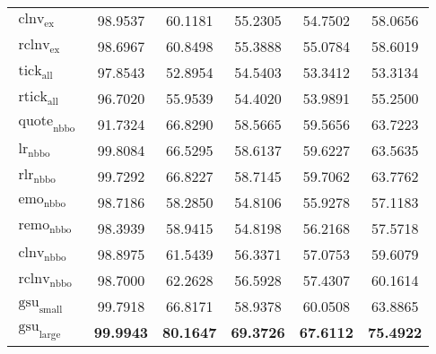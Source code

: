 \begin{table}[ht]
\begin{tabular}{@{}lSSSSS@{}}
        $\operatorname{clnv}_{\mathrm{ex}}$    & 98.9537           & 60.1181                            & 55.2305           & 54.7502           & 58.0656           \\
        $\operatorname{rclnv}_{\mathrm{ex}}$   & 98.6967           & 60.8498                            & 55.3888           & 55.0784           & 58.6019           \\ \midrule
        $\operatorname{tick}_{\mathrm{all}}$   & 97.8543           & 52.8954                            & 54.5403           & 53.3412           & 53.3134           \\
        $\operatorname{rtick}_{\mathrm{all}}$  & 96.7020           & 55.9539                            & 54.4020           & 53.9891           & 55.2500           \\ \midrule
        $\operatorname{quote}_{\mathrm{nbbo}}$ & 91.7324           & 66.8290                            & 58.5665           & 59.5656           & 63.7223           \\
        $\operatorname{lr}_{\mathrm{nbbo}}$    & 99.8084           & 66.5295                            & 58.6137           & 59.6227           & 63.5635           \\
        $\operatorname{rlr}_{\mathrm{nbbo}}$   & 99.7292           & 66.8227                            & 58.7145           & 59.7062           & 63.7762           \\
        $\operatorname{emo}_{\mathrm{nbbo}}$   & 98.7186           & 58.2850                            & 54.8106           & 55.9278           & 57.1183           \\
        $\operatorname{remo}_{\mathrm{nbbo}}$  & 98.3939           & 58.9415                            & 54.8198           & 56.2168           & 57.5718           \\
        $\operatorname{clnv}_{\mathrm{nbbo}}$  & 98.8975           & 61.5439                            & 56.3371           & 57.0753           & 59.6079           \\
        $\operatorname{rclnv}_{\mathrm{nbbo}}$ & 98.7000           & 62.2628                            & 56.5928           & 57.4307           & 60.1614           \\ \midrule
        $\operatorname{gsu}_{\mathrm{small}}$  & 99.7918           & 66.8171                            & 58.9378           & 60.0508           & 63.8865           \\
        $\operatorname{gsu}_{\mathrm{large}}$  & \bfseries 99.9943 & \bfseries 80.1647                  & \bfseries 69.3726 & \bfseries 67.6112 & \bfseries 75.4922 \\
        \bottomrule
    \end{tabular}
\end{table}

